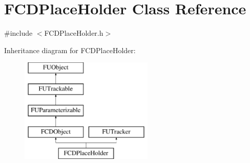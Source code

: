 \hypertarget{classFCDPlaceHolder}{
\section{FCDPlaceHolder Class Reference}
\label{classFCDPlaceHolder}
}


{\ttfamily \#include $<$FCDPlaceHolder.h$>$}

Inheritance diagram for FCDPlaceHolder:\begin{figure}[H]
\begin{center}
\leavevmode
\includegraphics[height=5.000000cm]{classFCDPlaceHolder}
\end{center}
\end{figure}
